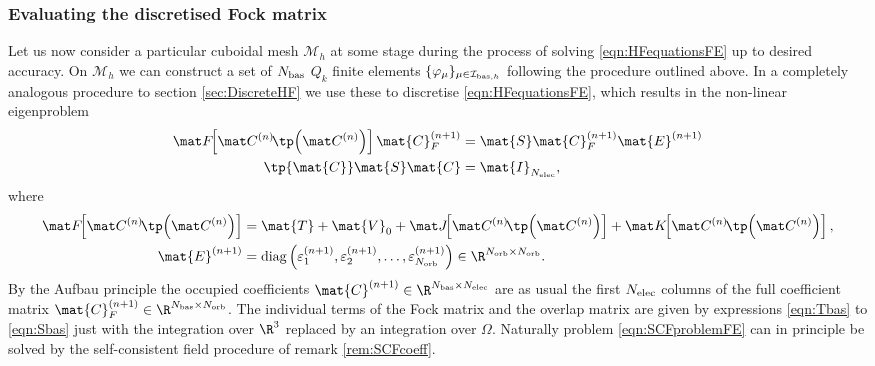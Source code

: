 \subsubsection{Evaluating the discretised Fock matrix}
Let us now consider a particular cuboidal mesh $\mathcal{M}_h$
at some stage during
the process of solving \eqref{eqn:HFequationsFE} up to desired accuracy.
On $\mathcal{M}_h$ we can construct
a set of $N_\text{bas}$ $Q_k$ finite elements $\{\varphi_\mu\}_{\mu\in\mathcal{I}_{\text{bas},h}}$
following the procedure outlined above.
In a completely analogous procedure to section \vref{sec:DiscreteHF}
we use these to discretise \eqref{eqn:HFequationsFE},
which results in the non-linear eigenproblem
\begin{equation}
	\begin{aligned}
		\matFnfull \mat{C}_F^{(n+1)} &= \mat{S} \mat{C}_F^{(n+1)} \mat{E}^{(n+1)} \\
		\tp{\mat{C}} \mat{S} \mat{C} &= \mat{I}_{\Nelec},
	\end{aligned}
	\label{eqn:SCFproblemFE}
\end{equation}
where
\begin{align*}
	\matFnfull &= \mat{T} + \mat{V}_0 + \matJnfull + \matKnfull, \\
	\mat{E}^{(n+1)}
	&= \text{diag}\left(\varepsilon_1^{(n+1)},
	\varepsilon_2^{(n+1)}, \ldots,
	\varepsilon_{\Norb}^{(n+1)}\right) \in \R^{\Norb \times \Norb}.
\end{align*}
By the Aufbau principle
the occupied coefficients $\mat{C}^{(n+1)} \in \R^{\Nbas \times \Nelec}$
are as usual the first $N_\text{elec}$ columns of the full coefficient matrix
$\mat{C}_F^{(n+1)} \in \R^{\Nbas \times \Norb}$.
The individual terms of the Fock matrix and the overlap matrix
are given by expressions \eqref{eqn:Tbas} to \eqref{eqn:Sbas}
just with the integration over $\R^3$ replaced by
an integration over $\Omega$.
Naturally problem \eqref{eqn:SCFproblemFE} can in principle be solved
by the self-consistent field procedure of remark \vref{rem:SCFcoeff}.

